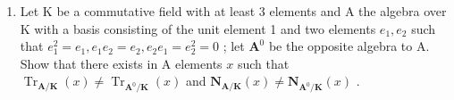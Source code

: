 \BourbakiExercisesSection

\begin{enumerate}
\def\labelenumi{\arabic{enumi}.}
\tightlist
\item
  Let K be a commutative field with at least 3 elements and A the algebra over K with a basis consisting of the unit element 1 and two elements \(e_1, e_2\) such that \(e_1^2 = e_1, e_1e_2 = e_2, e_2e_1 = e_2^2 = 0\) ; let \(\mathbf{A}^0\) be the opposite algebra to A. Show that there exists in A elements \(x\) such that \(\operatorname{Tr}_{\mathbf{A} / \mathbf{K}}(x) \neq \operatorname{Tr}_{\mathbf{A}^0 / \mathbf{K}}(x)\) and \(\mathbf{N}_{\mathbf{A} / \mathbf{K}}(x) \neq \mathbf{N}_{\mathbf{A}^0 / \mathbf{K}}(x)\) .
\end{enumerate}

